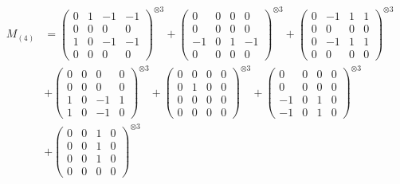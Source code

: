 \documentclass{article}
\newcommand{\Mthree}{%
    M_{(4)}
}
\begin{document}
        \newpage
        
        \footnotesize{
        \begin{align}
        \Mthree
        &= \label{Rs16-Rc11-Solution-25-c1} \begin{pmatrix} 0 & 1 & -1 & -1 \\ 0 & 0 & 0 & 0 \\ 1 & 0 & -1 & -1 \\ 0 & 0 & 0 & 0 \end{pmatrix}^{\otimes 3} 
            + \begin{pmatrix} 0 & 0 & 0 & 0 \\ 0 & 0 & 0 & 0 \\ -1 & 0 & 1 & -1 \\ 0 & 0 & 0 & 0 \end{pmatrix}^{\otimes 3} 
            + \begin{pmatrix} 0 & -1 & 1 & 1 \\ 0 & 0 & 0 & 0 \\ 0 & -1 & 1 & 1 \\ 0 & 0 & 0 & 0 \end{pmatrix}^{\otimes 3} \\
        &+ \label{Rs16-Rc11-Solution-25-c4} \begin{pmatrix} 0 & 0 & 0 & 0 \\ 0 & 0 & 0 & 0 \\ 1 & 0 & -1 & 1 \\ 1 & 0 & -1 & 0 \end{pmatrix}^{\otimes 3} 
            + \begin{pmatrix} 0 & 0 & 0 & 0 \\ 0 & 1 & 0 & 0 \\ 0 & 0 & 0 & 0 \\ 0 & 0 & 0 & 0 \end{pmatrix}^{\otimes 3} 
            + \begin{pmatrix} 0 & 0 & 0 & 0 \\ 0 & 0 & 0 & 0 \\ -1 & 0 & 1 & 0 \\ -1 & 0 & 1 & 0 \end{pmatrix}^{\otimes 3} \\
        &+ \label{Rs16-Rc11-Solution-25-c7} \begin{pmatrix} 0 & 0 & 1 & 0 \\ 0 & 0 & 1 & 0 \\ 0 & 0 & 1 & 0 \\ 0 & 0 & 0 & 0 \end{pmatrix}^{\otimes 3} 

\end{align}}
\end{document}
